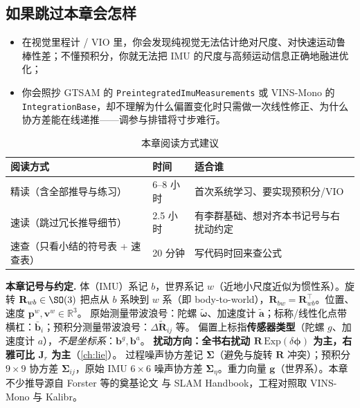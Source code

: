 \subsection*{如果跳过本章会怎样}
\begin{itemize}
  \item 在视觉里程计 / VIO 里，你会发现纯视觉无法估计绝对尺度、对快速运动鲁棒性差；不懂预积分，你就无法把 IMU 的尺度与高频运动信息正确地融进优化；
  \item 你会照抄 GTSAM 的 \texttt{PreintegratedImuMeasurements} 或 VINS-Mono 的 \texttt{IntegrationBase}，却不理解为什么偏置变化时只需做一次线性修正、为什么协方差能在线递推——调参与排错将寸步难行。
\end{itemize}

\begin{table}[H]\centering\small
\caption{本章阅读方式建议}
\begin{tabular}{lll}
\toprule
阅读方式 & 时间 & 适合谁 \\
\midrule
精读（含全部推导与练习） & 6--8 小时 & 首次系统学习、要实现预积分/VIO \\
速读（跳过冗长推导细节） & 2.5 小时 & 有李群基础、想对齐本书记号与右扰动约定 \\
速查（只看小结的符号表 + 速查表） & 20 分钟 & 写代码时回来查公式 \\
\bottomrule
\end{tabular}
\end{table}

\begin{note}
\textbf{本章记号与约定.}\;
体（IMU）系记 $b$，世界系记 $w$（近地小尺度近似为惯性系）。旋转 $\mathbf R_{wb}\in\SO(3)$ 把点从 $b$ 系映到 $w$ 系（即 body-to-world），$\mathbf R_{bw}=\mathbf R_{wb}^\top$。位置、速度 $\mathbf p^w,\mathbf v^w\in\mathbb R^3$。
原始测量带波浪号：陀螺 $\tilde{\boldsymbol\omega}$、加速度计 $\tilde{\mathbf a}$；标称/线性化点带横杠：$\bar{\mathbf b}_i$；预积分测量带波浪号：$\Delta\tilde{\mathbf R}_{ij}$ 等。
偏置上标指\textbf{传感器类型}（陀螺 $g$、加速度计 $a$），\emph{不是坐标系}：$\mathbf b^g,\mathbf b^a$。
\textbf{扰动方向：全书右扰动 $\mathbf R\,\mathrm{Exp}(\delta\boldsymbol\phi)$ 为主，右雅可比 $\mathbf J_r$ 为主}（\cref{ch:lie}）。
过程噪声协方差记 $\boldsymbol\Sigma$（避免与旋转 $\mathbf R$ 冲突）；预积分 $9\times9$ 协方差 $\boldsymbol\Sigma_{ij}$，原始 IMU $6\times6$ 噪声协方差 $\boldsymbol\Sigma_\eta$。重力向量 $\mathbf g$（世界系）。本章不少推导源自 Forster 等的奠基论文\cite{forster2017preintegration} 与 SLAM Handbook\cite{carlone2026handbook}，工程对照取 VINS-Mono\cite{qin2018vins} 与 Kalibr\cite{rehder2016kalibr}。
\end{note}

